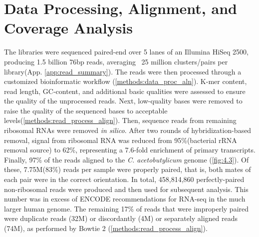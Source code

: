 \section{Data Processing, Alignment, and Coverage Analysis}
The libraries were sequenced paired-end over 5 lanes of an Illumina HiSeq 2500, producing 1.5 billion 76bp reads, averaging ~25 million clusters/pairs per library(App. \ref{app:read_summary}). The reads were then processed through a customized bioinformatic workflow (\ref{methods:data_proc_aln}). K-mer content, read length, GC-content, and additional basic qualities were assessed to ensure the quality of the unprocessed reads. Next, low-quality bases were removed to raise the quality of the sequenced bases to acceptable levels(\ref{methods:read_process_align}). Then, sequence reads from remaining ribosomal RNAs were removed \textit{in silico}. After two rounds of hybridization-based removal, signal from ribosomal RNA was reduced from 95\%(bacterial rRNA removal source) to 62\%, representing a 7.6-fold enrichment of primary transcripts. Finally, 97\% of the reads aligned to the \textit{C. acetobutylicum} genome (\ref{fig:4.3}). Of these, 7.75M(83\%) reads per sample were properly paired, that is, both mates of each pair were in the correct orientation. In total, 458,814,860 perfectly-paired non-ribosomal reads were produced and then used for subsequent analysis. This number was in excess of ENCODE recommendations for RNA-seq in the much larger human genome.\cite{110} The remaining 17\% of reads that were improperly paired were duplicate reads (32M)  or discordantly (4M) or separately aligned reads (74M), as performed by Bowtie 2 (\ref{methods:read_process_align}).


